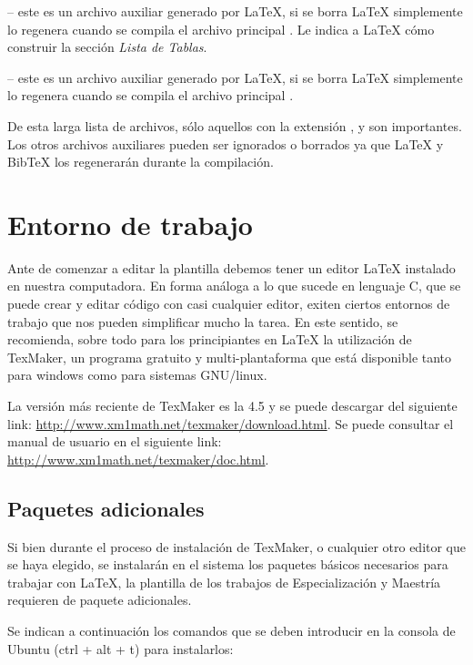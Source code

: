  -- este es un archivo auxiliar generado por \LaTeX{}, si se borra \LaTeX{} simplemente lo regenera cuando se compila el archivo principal .  Le indica a \LaTeX{} cómo construir la sección \emph{Lista de Tablas}.

 -- este es un archivo auxiliar generado por \LaTeX{}, si se borra \LaTeX{} simplemente lo regenera cuando se compila el archivo principal .

De esta larga lista de archivos, sólo aquellos con la extensión ,  y  son importantes.  Los otros archivos auxiliares pueden ser ignorados o borrados ya que \LaTeX{} y BibTeX los regenerarán durante la compilación.


\section{Entorno de trabajo}

Ante de comenzar a editar la plantilla debemos tener un editor \LaTeX{} instalado en nuestra computadora.  En forma análoga a lo que sucede en lenguaje C, que se puede crear y editar código con casi cualquier editor, exiten ciertos entornos de trabajo que nos pueden simplificar mucho la tarea.  En este sentido, se recomienda, sobre todo para los principiantes en \LaTeX{} la utilización de TexMaker, un programa gratuito y multi-plantaforma que está disponible tanto para windows como para sistemas GNU/linux.

La versión más reciente de TexMaker es la 4.5 y se puede descargar del siguiente link: \url{http://www.xm1math.net/texmaker/download.html}. Se puede consultar el manual de usuario en el siguiente link: \url{http://www.xm1math.net/texmaker/doc.html}.
 

\subsection{Paquetes adicionales}

Si bien durante el proceso de instalación de TexMaker, o cualquier otro editor que se haya elegido, se instalarán en el sistema los paquetes básicos necesarios para trabajar con \LaTeX{}, la plantilla de los trabajos de Especialización y Maestría requieren de paquete adicionales.

Se indican a continuación los comandos que se deben introducir en la consola de Ubuntu (ctrl + alt + t) para instalarlos:

